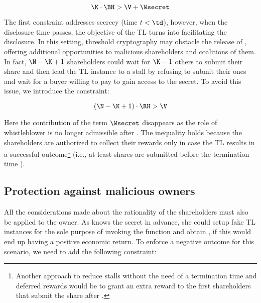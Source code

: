 \begin{equation}\label{eqcoscom2}
\K \cdot \BH > \V + \Wsecret
\end{equation}


The first constraint addresses secrecy (time $t < \td$), however, when the disclosure time passes, the objective of the TL turns into facilitating the disclosure.
In this setting, threshold cryptography may obstacle the release of \secret, offering additional opportunities to malicious shareholders and coalitions of them.
In fact, $\N - \K + 1$ shareholders could wait for $\K - 1$ others to submit their share and then lead the TL instance to a stall by refusing to submit their ones and wait for a buyer willing to pay \V to gain access to the secret.
To avoid this issue, we introduce the constraint:  

\begin{equation}\label{eqcoscom4}
(\N - \K + 1) \cdot \RH  > \V
\end{equation}

Here the contribution of the term $\Wsecret$ disappears as the role of whistleblower is no longer admissible after \td. The inequality holds because the shareholders are authorized to collect their rewards \RH only in case the TL results in a successful outcome\footnote{Another approach to reduce stalls without the need of a termination time and deferred rewards would be to grant an extra reward \extrareward to the first \K shareholders that submit the share after \td.
}
(i.e., at least \K shares are submitted before the termination time \te).


\subsection{Protection against malicious owners}\label{sect:mal_own}

All the considerations made about the rationality of the shareholders must also be applied to the owner.
As \owner knows the secret in advance, she could setup fake TL instances for the sole purpose of invoking the \texttt{\algowhistleblowsecret} function and obtain \Wsecret, if this would end up having a positive economic return.
%
To enforce a negative outcome for this scenario, we need to add the following constraint:

